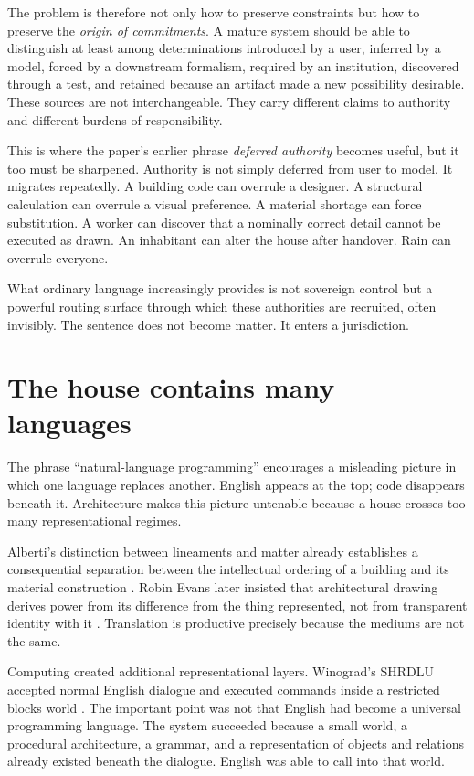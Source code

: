 \documentclass[11pt]{article}
\begin{document}
The problem is therefore not only how to preserve constraints but how to preserve the \emph{origin of commitments}. A mature system should be able to distinguish at least among determinations introduced by a user, inferred by a model, forced by a downstream formalism, required by an institution, discovered through a test, and retained because an artifact made a new possibility desirable. These sources are not interchangeable. They carry different claims to authority and different burdens of responsibility.

This is where the paper's earlier phrase \emph{deferred authority} becomes useful, but it too must be sharpened. Authority is not simply deferred from user to model. It migrates repeatedly. A building code can overrule a designer. A structural calculation can overrule a visual preference. A material shortage can force substitution. A worker can discover that a nominally correct detail cannot be executed as drawn. An inhabitant can alter the house after handover. Rain can overrule everyone.

What ordinary language increasingly provides is not sovereign control but a powerful routing surface through which these authorities are recruited, often invisibly. The sentence does not become matter. It enters a jurisdiction.

\section{The house contains many languages}

The phrase ``natural-language programming'' encourages a misleading picture in which one language replaces another. English appears at the top; code disappears beneath it. Architecture makes this picture untenable because a house crosses too many representational regimes.

Alberti's distinction between lineaments and matter already establishes a consequential separation between the intellectual ordering of a building and its material construction \citep{alberti1988building}. Robin Evans later insisted that architectural drawing derives power from its difference from the thing represented, not from transparent identity with it \citep{evans1997translations}. Translation is productive precisely because the mediums are not the same.

Computing created additional representational layers. Winograd's SHRDLU accepted normal English dialogue and executed commands inside a restricted blocks world \citep{winograd1971procedures}. The important point was not that English had become a universal programming language. The system succeeded because a small world, a procedural architecture, a grammar, and a representation of objects and relations already existed beneath the dialogue. English was able to call into that world.
\end{document}
